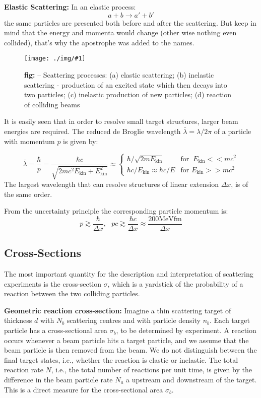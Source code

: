 \documentclass[10pt,a4paper]{article}
\newcounter{figurecounter}
\newcommand{\img}[3]{
    \begin{figure}[h!]
        \centering
        \captionsetup{justification=centering,margin=0cm,labelformat=empty}
        \texttt{[image: ./img/\#1]}
        \label{figure}
        \caption{\small\textbf{fig: \thefigurecounter} -- \textcolor{darkliver}{#3}}
    \end{figure}
    \addtocounter{figurecounter}{1}}
\newcommand{\mev}{\text{MeV}}
\begin{document}
\textbf{Elastic Scattering:} In an elastic process:
$$
a + b \rightarrow a' + b'
$$
the same particles are presented both before and after the scattering. But keep in mind that the energy and momenta would change (other wise nothing even collided), that's why the apostrophe was added to the names.
\img{scatterings}{1}{Scattering processes: (a) elastic scattering; (b) inelastic scattering - production of an excited state which then decays into two particles; (c) inelastic production of new particles; (d) reaction of colliding beams}

It is easily seen that in order to resolve small target structures, larger beam energies are required. The reduced de Broglie wavelength $\bar\lambda = \lambda /2\pi$ of a particle with momentum $p$ is given by:

\begin{equation}
    \bar\lambda = \frac{\hbar}{p}=\frac{\hbar c}{\sqrt{2mc^2E_{\text{kin}}+E^2_{\text{kin}}}}\approx \left\{
        \begin{array}{ll}
            \hbar/\sqrt{2mE_{\text{kin}}} & \text{for } \ E_{\text{kin}} <\!< mc^2\\
            \hbar c/E_{\text{kin}} \approx \hbar c / E & \text{for } E_{\text{kin}} >\!> mc^2
        \end{array}
    \right.
\end{equation}
The largest wavelength that can resolve structures of linear extension $\Delta x$, is of the same order.

From the uncertainty principle the corresponding particle momentum is:
\begin{equation}
    p \gtrsim\frac{\hbar}{\Delta x} ,  \ \ \ pc \gtrsim \frac{\hbar c}{\Delta x} \approx \frac{200\mev \text{fm}}{\Delta x}
\end{equation}

\subsection{Cross-Sections}
The most important quantity for the description and interpretation of scattering experiments is the cross-section $\sigma$, which is a yardstick of the probability of a reaction between the two colliding particles.

\textbf{Geometric reaction cross-section:} Imagine a thin scattering target of thickness $d$ with $N_b$ scattering centres and with particle density $n_b$. Each target particle has a cross-sectional area $\sigma_b$, to be determined by experiment. 
A reaction occurs whenever a beam particle hits a target particle, and we assume that the beam particle is then removed from the beam. We do not distinguish between the final target states, i.e., whether the reaction is elastic or inelastic. The total reaction rate $N$, i.e., the total number of reactions per unit time, is given by the difference in the beam particle rate $N_a$ a upstream and downstream of the target. This is a direct measure for the cross-sectional area $\sigma_b$.
\end{document}

